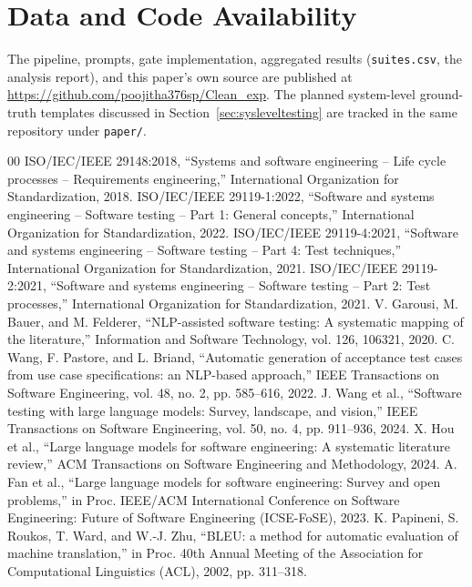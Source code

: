 \documentclass[conference]{IEEEtran}
\begin{document}
\section*{Data and Code Availability}
The pipeline, prompts, gate implementation, aggregated results
(\texttt{suites.csv}, the analysis report), and this paper's own source are
published at \url{https://github.com/poojitha376sp/Clean_exp}. The planned
system-level ground-truth templates discussed in
Section~\ref{sec:sysleveltesting} are tracked in the same repository under
\texttt{paper/}.

\begin{thebibliography}{00}
 ISO/IEC/IEEE 29148:2018, ``Systems and software engineering -- Life cycle processes -- Requirements engineering,'' International Organization for Standardization, 2018.
 ISO/IEC/IEEE 29119-1:2022, ``Software and systems engineering -- Software testing -- Part 1: General concepts,'' International Organization for Standardization, 2022.
 ISO/IEC/IEEE 29119-4:2021, ``Software and systems engineering -- Software testing -- Part 4: Test techniques,'' International Organization for Standardization, 2021.
 ISO/IEC/IEEE 29119-2:2021, ``Software and systems engineering -- Software testing -- Part 2: Test processes,'' International Organization for Standardization, 2021.
 V. Garousi, M. Bauer, and M. Felderer, ``NLP-assisted software testing: A systematic mapping of the literature,'' Information and Software Technology, vol. 126, 106321, 2020.
 C. Wang, F. Pastore, and L. Briand, ``Automatic generation of acceptance test cases from use case specifications: an NLP-based approach,'' IEEE Transactions on Software Engineering, vol. 48, no. 2, pp. 585--616, 2022.
 J. Wang et al., ``Software testing with large language models: Survey, landscape, and vision,'' IEEE Transactions on Software Engineering, vol. 50, no. 4, pp. 911--936, 2024.
 X. Hou et al., ``Large language models for software engineering: A systematic literature review,'' ACM Transactions on Software Engineering and Methodology, 2024.
 A. Fan et al., ``Large language models for software engineering: Survey and open problems,'' in Proc. IEEE/ACM International Conference on Software Engineering: Future of Software Engineering (ICSE-FoSE), 2023.
 K. Papineni, S. Roukos, T. Ward, and W.-J. Zhu, ``BLEU: a method for automatic evaluation of machine translation,'' in Proc. 40th Annual Meeting of the Association for Computational Linguistics (ACL), 2002, pp. 311--318.

\end{thebibliography}
\end{document}
